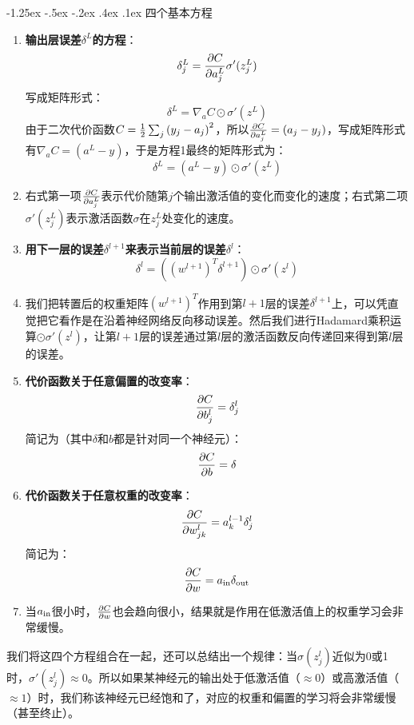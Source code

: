 \documentclass[a4paper, 11pt]{article}
\makeatletter
\newcommand{\xiaosihao}{\fontsize{12pt}{\baselineskip}\selectfont}
\renewcommand\subsection{\@startsection{subsection}{1}{\z@}%
{-1.25ex \@plus -.5ex \@minus -.2ex}%
{.4ex \@plus .1ex}%
{\normalfont\xiaosihao\CJKfamily{hei}}}
\makeatother
\begin{document}
\begin{CJK*}{GBK}{song}
\subsection{四个基本方程}
\begin{enumerate}[leftmargin=35pt,labelwidth=30pt]
\renewcommand{\labelenumi}{方程1:}
\item {\bf 输出层误差${\delta ^L}$的方程}：
$$\delta _j^L = {{\partial C} \over {\partial a_j^L}}\sigma '(z_j^L)$$
写成矩阵形式：
$${\delta ^L} = {\nabla _a}C \odot \sigma '({z^L})$$
由于二次代价函数$C = {1 \over 2}\sum\nolimits_j {{{({y_j} - {a_j})}^2}} $，所以${{\partial C} \over {\partial a_j^L}} = ({a_j} - {y_j})$，写成矩阵形式有${\nabla _a}C = ({a^L} - y)$，于是方程1最终的矩阵形式为：
$${\delta ^L} = ({a^L} - y) \odot \sigma '({z^L})$$
\renewcommand{\labelenumi}{解释:}
\item 右式第一项${{\partial C} \over {\partial a_j^L}}$表示代价随第$j$个输出激活值的变化而变化的速度；右式第二项$\sigma '(z_j^L)$表示激活函数$\sigma$在$z_j^L$处变化的速度。
\renewcommand{\labelenumi}{方程2:}
\item {\bf 用下一层的误差${\delta ^{l+1}}$来表示当前层的误差${\delta ^l}$}：
$${\delta ^l} = ({({w^{l + 1}})^T}{\delta ^{l + 1}}) \odot \sigma '({z^l})$$
\renewcommand{\labelenumi}{解释:}
\item 我们把转置后的权重矩阵${({w^{l + 1}})^T}$作用到第$l+1$层的误差${\delta ^{l + 1}}$上，可以凭直觉把它看作是在沿着神经网络反向移动误差。然后我们进行Hadamard乘积运算$\odot \sigma '({z^l})$，让第$l+1$层的误差通过第$l$层的激活函数反向传递回来得到第$l$层的误差。
\renewcommand{\labelenumi}{方程3:}
\item {\bf 代价函数关于任意偏置的改变率}：
$${{\partial C} \over {\partial b_j^l}} = \delta _j^l$$
简记为（其中$\delta $和$b$都是针对同一个神经元）：
$${{\partial C} \over {\partial b}} = \delta $$
\renewcommand{\labelenumi}{方程4:}
\item {\bf 代价函数关于任意权重的改变率}：
$${{\partial C} \over {\partial w_{jk}^l}} = a_k^{l - 1}\delta _j^l$$
简记为：
$${{\partial C} \over {\partial w}} = {a_{{\rm{in}}}}{\delta _{{\rm{out}}}}$$
\renewcommand{\labelenumi}{解释:}
\item 当${a_{{\rm{in}}}}$很小时，${{\partial C} \over {\partial w}}$也会趋向很小，结果就是作用在低激活值上的权重学习会非常缓慢。
\end{enumerate}
\indent
我们将这四个方程组合在一起，还可以总结出一个规律：当$\sigma (z_j^l)$近似为0或1时，$\sigma '(z_j^l)\approx 0$。所以如果某神经元的输出处于低激活值（$ \approx 0$）或高激活值（$ \approx 1$）时，我们称该神经元已经饱和了，对应的权重和偏置的学习将会非常缓慢（甚至终止）。

\end{CJK*}
\end{document}
